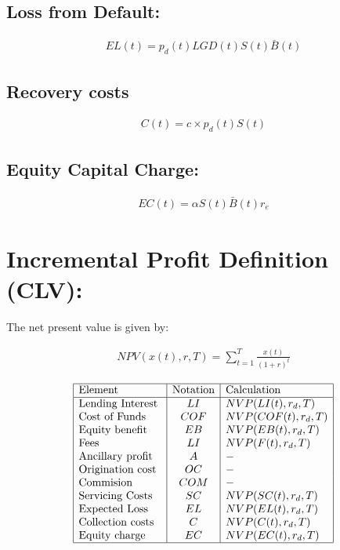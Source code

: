 \subsection{ Loss from Default: }
\begin{align}
EL(t) =  p_d(t)LGD(t)S(t)\bar{ B}(t) 
\end{align}
\subsection{Recovery costs}
\begin{align}
C(t) = c\times p_d(t) S(t)
\end{align}

\subsection{ Equity Capital Charge: }
\begin{align}
 EC(t) =  \alpha S(t)\bar{ B}(t) r_e
\end{align}


\section{ Incremental Profit Definition (CLV): }
The net present value is given by:

\begin{align}
NPV(x(t),r,T)=\sum_{t=1}^T \frac{x(t)}{(1+r)^t}
\end{align}

\renewcommand{\arraystretch}{1.5} %
\begin{center} %
\[ %
\begin{array}{|l|c|l|} \hline %
\mbox{Element} & \mbox{Notation} & \mbox{Calculation}\\ \hline
\mbox{Lending Interest }  & LI & NVP(LI(t),r_d,T)\\
\mbox{Cost of Funds   }  & COF & NVP(COF(t),r_d,T)\\
\mbox{Equity benefit }  & EB & NVP(EB(t),r_d,T)\\
\mbox{Fees }  & LI & NVP(F(t),r_d,T)\\
\mbox{Ancillary profit }  & A & -\\
\mbox{Origination cost}  & OC & -\\
\mbox{Commision  }  & COM & -\\
\mbox{Servicing Costs}  & SC & NVP(SC(t),r_d,T)\\
\mbox{Expected Loss }  & EL & NVP(EL(t),r_d,T)\\
\mbox{Collection costs }  & C & NVP(C(t),r_d,T)\\
\mbox{Equity charge}  & EC & NVP(EC(t),r_d,T)\\

\hline
\end{array} %
\] %
\end{center}

